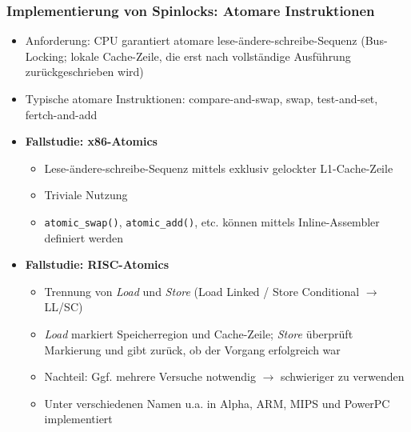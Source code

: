 \subsubsection{Implementierung von Spinlocks: Atomare Instruktionen}
\begin{itemize}
	\item Anforderung: CPU garantiert atomare lese-ändere-schreibe-Sequenz (Bus-Locking; lokale Cache-Zeile, die erst nach vollständige Ausführung zurückgeschrieben wird)
	\item Typische atomare Instruktionen: compare-and-swap, swap, test-and-set, fertch-and-add
	\item \textbf{Fallstudie: x86-Atomics}
	\begin{itemize}
		\item Lese-ändere-schreibe-Sequenz mittels exklusiv gelockter L1-Cache-Zeile
		\item Triviale Nutzung
		\item \texttt{atomic\_swap()}, \texttt{atomic\_add()}, etc. können mittels Inline-Assembler definiert werden
	\end{itemize}
	\item \textbf{Fallstudie: RISC-Atomics}
	\begin{itemize}
		\item Trennung von \textit{Load} und \textit{Store} (Load Linked / Store Conditional \(\rightarrow\) LL/SC)
		\item \textit{Load} markiert Speicherregion und Cache-Zeile; \textit{Store} überprüft Markierung und gibt zurück, ob der Vorgang erfolgreich war
		\item Nachteil: Ggf. mehrere Versuche notwendig \(\rightarrow\) schwieriger zu verwenden
		\item Unter verschiedenen Namen u.a. in Alpha, ARM, MIPS und PowerPC implementiert
	\end{itemize}
\end{itemize}

